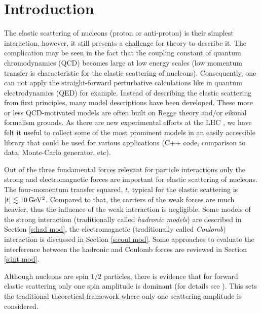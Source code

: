\documentclass[preprint,12pt]{elsarticle}
\def\un#1{{\,\rm #1}}
\begin{document}
\newpage


\section{Introduction}\label{s:inc}

The elastic scattering of nucleons (proton or anti-proton) is their simplest interaction, however, it still presents a challenge for theory to describe it. The complication may be seen in the fact that the coupling constant of quantum chromodynamics (QCD) becomes large at low energy scales (low momentum transfer is characteristic for the elastic scattering of nucleons). Consequently, one can not apply the straight-forward perturbative calculations like in quantum electrodynamics (QED) for example. Instead of describing the elastic scattering from first principles, many model descriptions have been developed. These more or less QCD-motivated models are often built on Regge theory and/or eikonal formalism grounds. As there are new experimental efforts at the LHC \cite{totem,alfa}, we have felt it useful to collect some of the most prominent models in an easily accessible library that could be used for various applications (C++ code, comparison to data, Monte-Carlo generator, etc).

Out of the three fundamental forces relevant for particle interactions only the strong and electromagnetic forces are important for elastic scattering of nucleons. The four-momentum transfer squared, $t$, typical for the elastic scattering is $|t| \lesssim 10\un{GeV^2}$. Compared to that, the carriers of the weak forces are much heavier, thus the influence of the weak interaction is negligible. Some models of the strong interaction (traditionally called {\em hadronic models}) are described in Section \ref{s:had mod}, the electromagnetic (traditionally called {\em Coulomb}) interaction is discussed in Section \ref{s:coul mod}. Some approaches to evaluate the interference between the hadronic and Coulomb forces are reviewed in Section \ref{s:int mod}.

Although nucleons are spin $1/2$ particles, there is evidence that for forward elastic scattering only one spin amplitude is dominant (for details see \cite[section 1]{jan_thesis}). This sets the traditional theoretical framework where only one scattering amplitude is considered.

\end{document}
